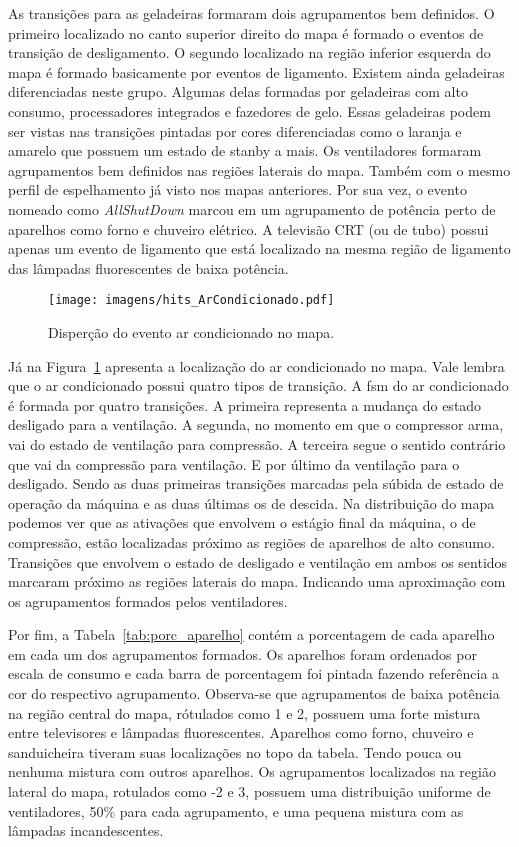 As transições para as geladeiras formaram dois agrupamentos bem
definidos. O primeiro localizado no canto superior direito do mapa é
formado o eventos de transição de desligamento. O segundo localizado
na região inferior esquerda do mapa é formado basicamente por eventos
de ligamento. Existem ainda geladeiras diferenciadas neste grupo.
Algumas delas formadas por geladeiras com alto consumo, processadores
integrados e fazedores de gelo. Essas geladeiras podem ser vistas nas
transições pintadas por cores diferenciadas como o laranja e amarelo
que possuem um estado de stanby a mais. Os ventiladores formaram
agrupamentos bem definidos nas regiões laterais do mapa. Também com o
mesmo perfil de espelhamento já visto nos mapas anteriores. 
Por sua vez, o evento nomeado como \emph{AllShutDown} marcou em um
agrupamento de potência perto de aparelhos como forno e chuveiro
elétrico. A televisão CRT (ou de tubo) possui apenas um evento de
ligamento que está localizado na mesma região de ligamento das
lâmpadas fluorescentes de baixa potência. 

\begin{figure}[!htb]
\centering
\texttt{[image: imagens/hits\_ArCondicionado.pdf]}
\caption{Disperção do evento ar condicionado no mapa.}
\label{fig:hit_ac}
\end{figure}

Já na Figura~\ref{fig:hit_ac} apresenta a localização do ar condicionado
no mapa. Vale lembra que o ar condicionado possui quatro tipos de
transição.  A \gls{fsm} do ar condicionado é formada por quatro
transições. A primeira representa a mudança do estado desligado para a
ventilação. A segunda, no momento em que o compressor arma, vai do
estado de ventilação para compressão. A terceira segue o sentido
contrário que vai da compressão para ventilação. E por último da
ventilação para o desligado. Sendo as duas primeiras transições
marcadas pela súbida de estado de operação da máquina e as duas
últimas os de descida. Na distribuição do mapa podemos ver que as
ativações que envolvem o estágio final da máquina, o de compressão,
estão localizadas próximo as regiões de aparelhos de alto consumo.
Transições que envolvem o estado de desligado e ventilação em ambos os
sentidos marcaram próximo as regiões laterais do mapa. Indicando uma
aproximação com os agrupamentos formados pelos ventiladores. 

Por fim, a Tabela~\ref{tab:porc_aparelho} contém a porcentagem de cada
aparelho em cada um dos agrupamentos formados. Os aparelhos foram
ordenados por escala de consumo e cada barra de porcentagem foi
pintada fazendo referência a cor do respectivo agrupamento.
Observa-se que agrupamentos de baixa potência na região central do
mapa, rótulados como 1 e 2, possuem uma forte mistura entre
televisores e lâmpadas fluorescentes. Aparelhos como forno, chuveiro e
sanduicheira tiveram suas localizações no topo da tabela. Tendo pouca
ou nenhuma mistura com outros aparelhos. Os agrupamentos localizados
na região lateral do mapa, rotulados como -2 e 3, possuem uma
distribuição uniforme de ventiladores, 50$\%$ para cada agrupamento, e
uma pequena mistura com as lâmpadas incandescentes.

